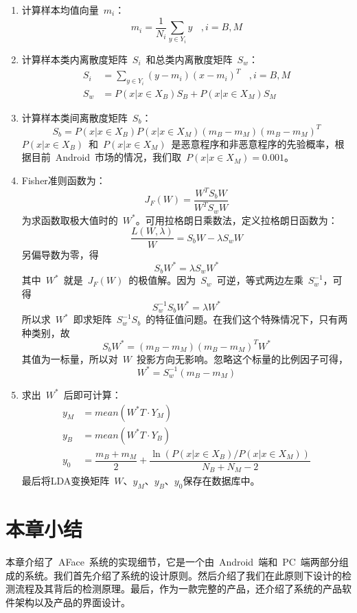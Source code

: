 \begin{enumerate}
		\begin{enumerate}
		\item 计算样本均值向量~$m_i$：
		\begin{equation*}
		m_i=\dfrac{1}{N_i}\sum_{y \in Y_i}y ~~~~,i=B,M
		\end{equation*}
		\item 计算样本类内离散度矩阵~$S_i$~和总类内离散度矩阵~$S_w$：
		\begin{align}
		S_i & = \sum_{y \in Y_i}(y-m_i)(x-m_i)^T ~~~~,i=B,M\\
		S_w & = P(x|x \in X_B)S_B + P(x|x\in X_M)S_M
		\end{align}
		\item 计算样本类间离散度矩阵~$S_b$：
		\begin{equation*}
		S_b=P(x|x \in X_B)P(x|x\in X_M)(m_B-m_M)(m_B-m_M)^T
		\end{equation*}
		$P(x|x \in X_B)$~和~$P(x|x\in X_M)$~是恶意程序和非恶意程序的先验概率，根据目前~Android~市场的情况，我们取~$P(x|x\in X_M)=0.001$。
		\item Fisher准则函数为：
		\begin{equation}
		J_F(W) = \dfrac{W^T S_b W}{W^T S_w W}
		\end{equation}
		 为求函数取极大值时的~$W^*$。可用拉格朗日乘数法，定义拉格朗日函数为：
		\begin{equation*}
		\dfrac{L(W,\lambda)}{W} = S_bW-\lambda S_w W
		\end{equation*}
		另偏导数为零，得
		\begin{equation*}
		S_b W^* = \lambda S_w W^*
		\end{equation*}
		 其中~$W^*$~就是~$J_F(W)$~的极值解。因为~$S_w$~可逆，等式两边左乘~$S_w^{-1}$，可得
		\begin{equation*}
		S_w^{-1} S_b W^* = \lambda W^*
		\end{equation*}
		所以求~$W^*$~即求矩阵~$S_w^{-1} S_b$~的特征值问题。在我们这个特殊情况下，只有两种类别，故
		\begin{equation*}
		S_b W^* = (m_B-m_M)(m_B-m_M)^T W^*
		\end{equation*}
		 其值为一标量，所以对~$W$~投影方向无影响。忽略这个标量的比例因子可得，
		\begin{equation*}
		W^* = S_w^{-1} (m_B-m_M)
		\end{equation*}
		\item 求出~$W^*$~后即可计算：
		\begin{align}
		y_M & = mean(W^*T \cdot Y_M) \\
		y_B & = mean(W^*T \cdot Y_B) \\
		y_0 & = \dfrac{m_B+m_M}{2}  +  \dfrac{\ln (P(x|x\in X_B)/P(x|x\in X_M))}{N_B+N_M-2}
		\end{align}
		 最后将LDA变换矩阵~$W$、$y_M$、$y_B$、$y_0$保存在数据库中。
		\end{enumerate}	
		\end{enumerate}
\section{本章小结}
本章介绍了~AFace~系统的实现细节，它是一个由~Android~端和~PC~端两部分组成的系统。我们首先介绍了系统的设计原则。然后介绍了我们在此原则下设计的检测流程及其背后的检测原理。最后，作为一款完整的产品，还介绍了系统的产品软件架构以及产品的界面设计。
